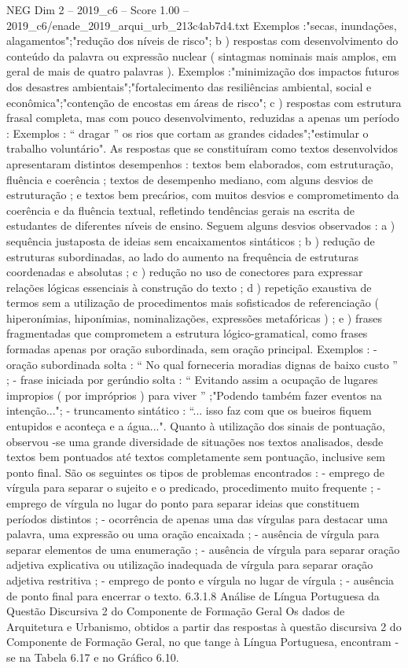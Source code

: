 \begin{textsample}{NEG Dim 2 – 2019\_c6 – Score 1.00 – 2019\_c6/enade\_2019\_arqui\_urb\_213c4ab7d4.txt}
Exemplos :"secas, inundações, alagamentos";"redução dos níveis de risco"; b ) respostas com desenvolvimento do conteúdo da palavra ou expressão nuclear ( sintagmas nominais mais amplos, em geral de mais de quatro palavras ).
Exemplos :"minimização dos impactos futuros dos desastres ambientais";"fortalecimento das resiliências ambiental, social e econômica";"contenção de encostas em áreas de risco"; c ) respostas com estrutura frasal completa, mas com pouco desenvolvimento, reduzidas a apenas um período : Exemplos : “ dragar ” os rios que cortam as grandes cidades";"estimular o trabalho voluntário".
As respostas que se constituíram como textos desenvolvidos apresentaram distintos desempenhos : textos bem elaborados, com estruturação, fluência e coerência ; textos de desempenho mediano, com alguns desvios de estruturação ; e textos bem precários, com muitos desvios e comprometimento da coerência e da fluência textual, refletindo tendências gerais na escrita de estudantes de diferentes níveis de ensino.
Seguem alguns desvios observados : a ) sequência justaposta de ideias sem encaixamentos sintáticos ; b ) redução de estruturas subordinadas, ao lado do aumento na frequência de estruturas coordenadas e absolutas ; c ) redução no uso de conectores para expressar relações lógicas essenciais à construção do texto ; d ) repetição exaustiva de termos sem a utilização de procedimentos mais sofisticados de referenciação ( hiperonímias, hiponímias, nominalizações, expressões metafóricas ) ; e ) frases fragmentadas que comprometem a estrutura lógico-gramatical, como frases formadas apenas por oração subordinada, sem oração principal.
Exemplos : - oração subordinada solta : “ No qual forneceria moradias dignas de baixo custo ” ; - frase iniciada por gerúndio solta : “ Evitando assim a ocupação de lugares impropios ( por impróprios ) para viver ” ;"Podendo também fazer eventos na intenção..."; - truncamento sintático : “... isso faz com que os bueiros fiquem entupidos e aconteça e a água...".
Quanto à utilização dos sinais de pontuação, observou -se uma grande diversidade de situações nos textos analisados, desde textos bem pontuados até textos completamente sem pontuação, inclusive sem ponto final.
São os seguintes os tipos de problemas encontrados : - emprego de vírgula para separar o sujeito e o predicado, procedimento muito frequente ; - emprego de vírgula no lugar do ponto para separar ideias que constituem períodos distintos ; - ocorrência de apenas uma das vírgulas para destacar uma palavra, uma expressão ou uma oração encaixada ; - ausência de vírgula para separar elementos de uma enumeração ; - ausência de vírgula para separar oração adjetiva explicativa ou utilização inadequada de vírgula para separar oração adjetiva restritiva ; - emprego de ponto e vírgula no lugar de vírgula ; - ausência de ponto final para encerrar o texto. 6.3.1.8 Análise de Língua Portuguesa da Questão Discursiva 2 do Componente de Formação Geral Os dados de Arquitetura e Urbanismo, obtidos a partir das respostas à questão discursiva 2 do Componente de Formação Geral, no que tange à Língua Portuguesa, encontram -se na Tabela 6.17 e no Gráfico 6.10.

\end{textsample}
